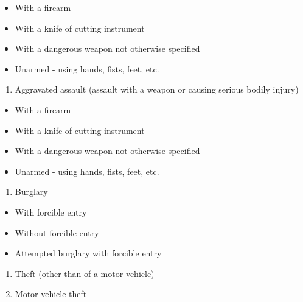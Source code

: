 \documentclass[
  12pt,
  openany]{book}
\providecommand{\tightlist}{%
  \setlength{\itemsep}{0pt}\setlength{\parskip}{0pt}}
\begin{document}
\begin{itemize}
\tightlist
\item
  With a firearm\\
\item
  With a knife of cutting instrument\\
\item
  With a dangerous weapon not otherwise specified\\
\item
  Unarmed - using hands, fists, feet, etc.\\
\end{itemize}

\begin{enumerate}
\def\labelenumi{\arabic{enumi}.}
\setcounter{enumi}{3}
\tightlist
\item
  Aggravated assault (assault with a weapon or causing serious bodily injury)\\
\end{enumerate}

\begin{itemize}
\tightlist
\item
  With a firearm\\
\item
  With a knife of cutting instrument\\
\item
  With a dangerous weapon not otherwise specified\\
\item
  Unarmed - using hands, fists, feet, etc.\\
\end{itemize}

\begin{enumerate}
\def\labelenumi{\arabic{enumi}.}
\setcounter{enumi}{4}
\tightlist
\item
  Burglary\\
\end{enumerate}

\begin{itemize}
\tightlist
\item
  With forcible entry\\
\item
  Without forcible entry\\
\item
  Attempted burglary with forcible entry\\
\end{itemize}

\begin{enumerate}
\def\labelenumi{\arabic{enumi}.}
\setcounter{enumi}{5}
\tightlist
\item
  Theft (other than of a motor vehicle)\\
\item
  Motor vehicle theft\\
\end{enumerate}
\end{document}

